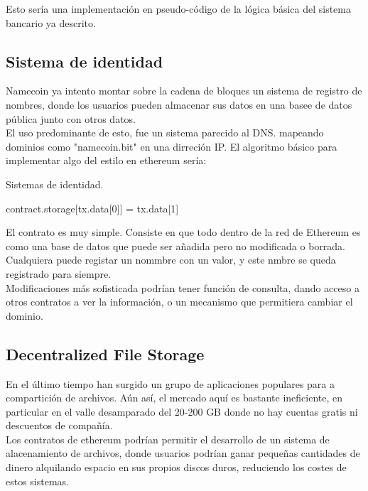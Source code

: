 \documentclass[11pt,a4paper]{article}
\begin{document}
Esto sería una implementación en pseudo-código de la lógica básica del sistema bancario ya descrito.


\subsection{Sistema de identidad}
Namecoin ya intento montar sobre la cadena de bloques un sistema de registro de nombres, donde los usuarios pueden almacenar sus datos en una basee de datos pública junto con otros datos.\\

El uso predominante de esto, fue un sistema parecido al DNS. mapeando dominios como "namecoin.bit" en una dirreción IP. El algoritmo básico para implementar algo del estilo en ethereum sería:

\begin{algorithm}
  \caption{Sistemas de identidad.}\label{token}
  \begin{algorithmic}[1]
    			
    
    \State contract.storage[tx.data[0]] = tx.data[1]
   
    \EndIf
    \EndProcedure
  \end{algorithmic}
\end{algorithm}


El contrato es muy simple. Consiste en que todo dentro de la red de Ethereum es como una base de datos que puede ser añadida pero no modificada o borrada. Cualquiera puede registar un nommbre con un valor, y este nmbre se queda registrado para siempre.\\

Modificaciones más sofisticada podrían tener función de consulta, dando acceso a otros contratos a ver la información, o un mecanismo que permitiera cambiar el dominio.
\subsection{Decentralized File Storage}

En el último tiempo han surgido un grupo de aplicaciones populares para a compartición de archivos. Aún así,  el mercado aquí es bastante ineficiente, en particular en el valle desamparado del 20-200 GB donde no hay cuentas gratis ni descuentos de compañía. \\

Los contratos de ethereum podrían permitir  el desarrollo de un sistema de alacenamiento de archivos, donde usuarios podrían ganar pequeñas cantidades de dinero alquilando espacio en sus propios discos duros, reduciendo los costes de estos sistemas.\\
\end{document}
